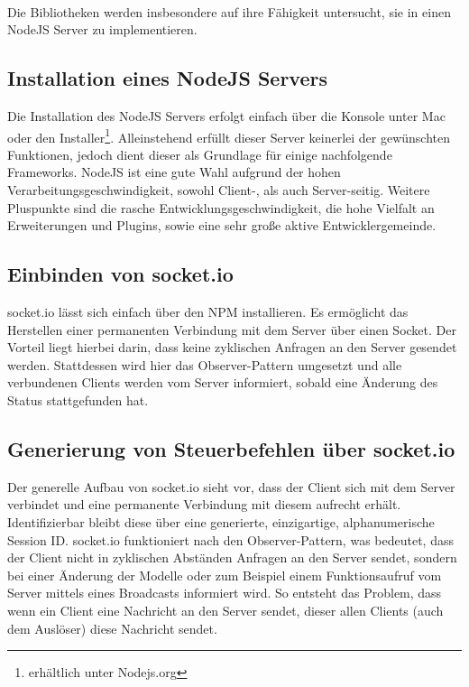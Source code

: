 \\Die Bibliotheken werden insbesondere auf ihre Fähigkeit untersucht, sie in einen \gls{NodeJS} Server zu implementieren.

	\subsection{Installation eines \gls{NodeJS} Servers}
	Die Installation des \gls{NodeJS} Servers erfolgt einfach über die Konsole unter Mac oder den Installer\footnote{erhältlich unter Nodejs.org}. Alleinstehend erfüllt dieser Server keinerlei der gewünschten Funktionen, jedoch dient dieser als Grundlage für einige nachfolgende \Gls{Framework}s. \gls{NodeJS} ist eine gute Wahl aufgrund der hohen Verarbeitungsgeschwindigkeit, sowohl Client-, als auch Server-seitig. Weitere Pluspunkte sind die rasche Entwicklungsgeschwindigkeit, die hohe Vielfalt an Erweiterungen und Plugins, sowie eine sehr große aktive Entwicklergemeinde.
	\subsection{Einbinden von socket.io}
	socket.io lässt sich einfach über den \Gls{NPM} installieren. Es ermöglicht das Herstellen einer permanenten Verbindung mit dem Server über einen Socket. Der Vorteil liegt hierbei darin, dass keine zyklischen Anfragen an den Server gesendet werden. Stattdessen wird hier das Observer-Pattern umgesetzt und alle verbundenen Clients werden vom Server informiert, sobald eine Änderung des Status stattgefunden hat. 
	
	\subsection{Generierung von Steuerbefehlen über socket.io}
	Der generelle Aufbau von socket.io sieht vor, dass der Client sich mit dem Server verbindet und eine permanente Verbindung mit diesem aufrecht erhält. Identifizierbar bleibt diese über eine generierte, einzigartige, alphanumerische Session ID. socket.io funktioniert nach den Observer-Pattern, was bedeutet, dass der Client nicht in zyklischen Abständen Anfragen an den Server sendet, sondern bei einer Änderung der Modelle oder zum Beispiel einem Funktionsaufruf vom Server mittels eines Broadcasts informiert wird. So entsteht das Problem, dass wenn ein Client eine Nachricht an den Server sendet, dieser allen Clients (auch dem Auslöser) diese Nachricht sendet. 
	
	
